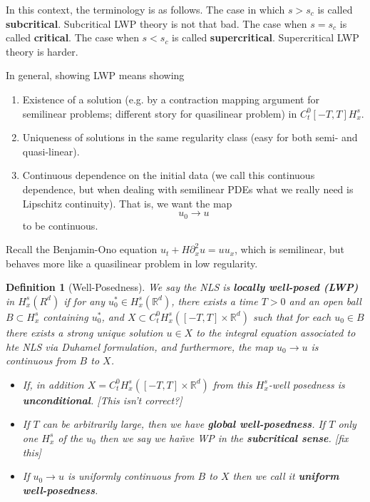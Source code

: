 \documentclass{article}
\def\purple{\color{Purple}}
\newcommand{\pnote}[1]{{\purple [#1]}} %
\newtheorem{definition}{Definition}
\def\R{\mathbb{R}} %
\begin{document}
In this context, the terminology is as follows. The case in which $s>s_{c}$ is
called \textbf{subcritical}. Subcritical LWP theory is not that bad. The case
when $s=s_{c}$ is called \textbf{critical}. The case when $s<s_{c}$ is called
\textbf{supercritical}. Supercritical LWP theory is harder.

In general, showing LWP means showing
\begin{enumerate}
  \item Existence of a solution (e.g. by a contraction mapping argument for
  semilinear problems; different story for quasilinear problem) in
  $C_{t}^{0}[-T,T]H_{x}^{s}$.
  \item Uniqueness of solutions in the same regularity class (easy for both
  semi- and quasi-linear).
  \item Continuous dependence on the initial data (we call this continuous
  dependence, but when dealing with semilinear PDEs what we really need is
  Lipschitz continuity). That is, we want the map
  \begin{equation*}
    u_{0}\to u
  \end{equation*}
  to be continuous.
\end{enumerate}

Recall the Benjamin-Ono equation $u_{t}+H\partial_{x}^{2}u=uu_{x}$, which is
semilinear, but behaves more like a quasilinear problem in low regularity.

\begin{definition}[Well-Posedness]
  \label{def:local-well-posedness}
  We say the NLS is \textbf{locally well-posed (LWP)} in $H_{x}^{s}(R^{d})$ if
  for any $u^{*}_{0}\in H_{x}^{s}(\R^{d})$, there exists a time $T>0$ and an open
  ball $B\subset H_{x}^{s}$ containing $u_{0}^{*}$, and
  $X\subset C_{t}^{0}H_{x}^{s}([-T,T]\times \R^{d})$ such that for each $u_{0}\in B$
  there exists a strong unique solution $u\in X$ to the integral equation
  associated to hte NLS via Duhamel formulation, and furthermore, the map
  $u_{0}\to u$ is continuous from $B$ to $X$.
  \begin{itemize}
    \item If, in addition $ X=C_{t}^{0}H_{x}^{s}\left( [-T,T]\times \R^{d} \right) $ from this
    $H_{x}^{s}$-well posedness is \textbf{unconditional}. \pnote{This isn't correct?}
    \item If $T$ can be arbitrarily large, then we have \textbf{global
      well-posedness}. If $T$ only one $H_{x}^{s}$ of the $u_{0}$ then we say we
    hañve WP in the \textbf{subcritical sense}. \pnote{fix this}
    \item If $u_{0}\to u$ is uniformly continuous from $B$ to $X$ then we call
    it \textbf{uniform well-posedness}.
  \end{itemize}
\end{definition}
\end{document}
